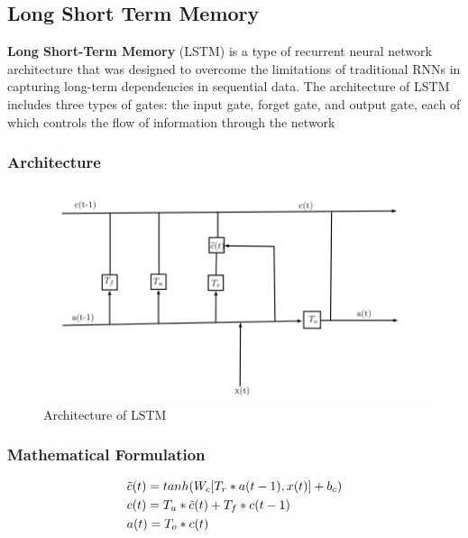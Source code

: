 \documentclass{article}
\begin{document}
\subsection{Long Short Term Memory}

\textbf{Long Short-Term Memory} (LSTM) is a type of recurrent neural network  architecture that was designed to overcome the limitations of traditional RNNs in capturing long-term dependencies in sequential data. The architecture of LSTM includes three types of gates: the input gate, forget gate, and output gate, each of which controls the flow of information through the network


\subsubsection{Architecture}
\vspace{1em}
\begin{figure}[h]
	\centering
	\includegraphics[scale=0.75]{images/lstm}
	\caption{Architecture of LSTM}
\end{figure}


\subsubsection{Mathematical Formulation}

\vspace{1em}

\begin{center}
\begin{tcolorbox}[colframe=orange,boxsep=5pt,boxrule=1pt,colback=white, width=0.6\linewidth]
\begin{equation*}
	\begin{aligned}
		\centering
		& \tilde{c}(t) = tanh( W_c [T_r * a(t-1), x(t)] + b_c)	\\
		& c(t) =  T_u * \tilde{c}(t) + T_f * c(t-1) \\
		& a(t) =  T_o * c(t) \\
	\end{aligned}
\end{equation*}
\end{tcolorbox}
\end{center}
\end{document}
